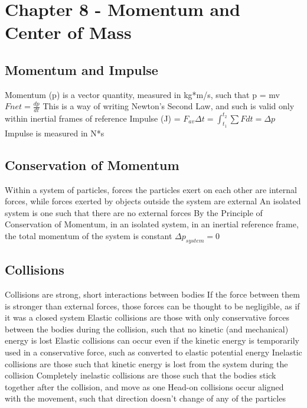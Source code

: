 \documentclass[11 pt, twoside]{article}
\newenvironment{outline*}
{
	\begin{outline}[enumerate]
	}
	{\end{outline}
}
\begin{document}
\section{Chapter 8 - Momentum and Center of Mass}
\subsection{Momentum and Impulse}
\begin{outline*}
\1 Momentum (p) is a vector quantity, measured in kg*m/s, such that p = mv
\1 $Fnet = \frac{dp}{dt}$
\2 This is a way of writing Newton’s Second Law, and such is valid only within inertial frames of reference
\1 Impulse (J) = $F_{av}\Delta t = \int^{t_2}_{t_1} \sum F dt = \Delta p$
\2 Impulse is measured in N*s
\end{outline*}
\subsection{Conservation of Momentum}
\begin{outline*}
\1 Within a system of particles, forces the particles exert on each other are internal forces, while forces exerted by objects outside the system are external
\2 An isolated system is one such that there are no external forces
\1 By the Principle of Conservation of Momentum, in an isolated system, in an inertial reference frame, the total momentum of the system is constant
\2 $\Delta p_{system} = 0$
\end{outline*}
\subsection{Collisions}
\begin{outline*}
\1 Collisions are strong, short interactions between bodies
\2 If the force between them is stronger than external forces, those forces can be thought to be negligible, as if it was a closed system
\1 Elastic collisions are those with only conservative forces between the bodies during the collision, such that no kinetic (and mechanical) energy is lost
\2 Elastic collisions can occur even if the kinetic energy is temporarily used in a conservative force, such as converted to elastic potential energy
\1 Inelastic collisions are those such that kinetic energy is lost from the system during the collision
\2 Completely inelastic collisions are those such that the bodies stick together after the collision, and move as one
\1 Head-on collisions occur aligned with the movement, such that direction doesn’t change of any of the particles
\end{outline*}
\end{document}
